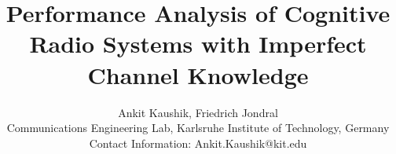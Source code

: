 \documentclass[12pt, draftclsnofoot, onecolumn]{IEEEtran}
\begin{document}
%
\title{Performance Analysis of Cognitive Radio Systems with Imperfect Channel Knowledge}
\author{Ankit Kaushik, Friedrich Jondral \\
Communications Engineering Lab, Karlsruhe Institute of Technology, Germany \\
Contact Information: Ankit.Kaushik@kit.edu
}


\maketitle
\thispagestyle{empty}
\pagestyle{empty}







\end{document}
